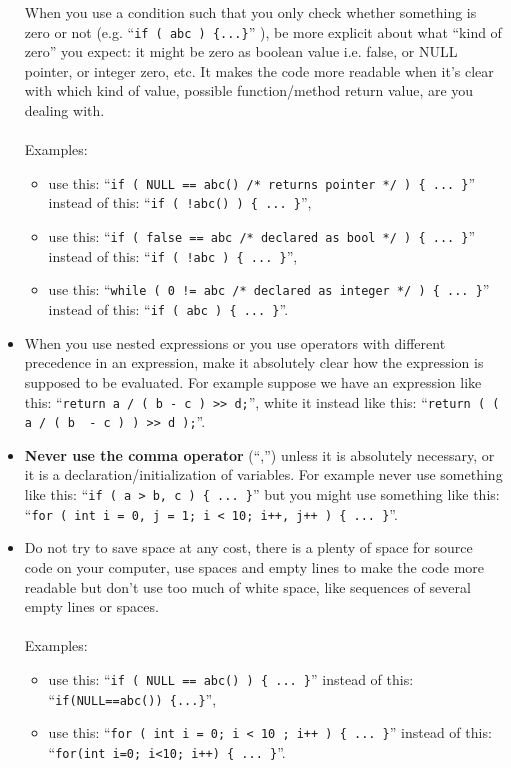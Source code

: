 \documentclass[a4paper,twoside,15pt]{book}
\begin{document}
\begin{itemize}
                When you use a condition such that you only check whether something is zero or not (e.g. ``\verb'if ( abc ) {...}''' ), be more explicit about what ``kind of zero'' you expect: it might be zero as boolean value i.e. false, or NULL pointer, or integer zero, etc. It makes the code more readable when it's clear with which kind of value, possible function/method return value, are you dealing with.\\\\
                Examples:
                \begin{itemize}
                    \item use this: ``\verb'if ( NULL == abc() /* returns pointer */ ) { ... }''' instead of this: ``\verb'if ( !abc() ) { ... }''',
                    \item use this: ``\verb'if ( false == abc /* declared as bool */ ) { ... }''' instead of this: ``\verb'if ( !abc ) { ... }''',
                    \item use this: ``\verb'while ( 0 != abc /* declared as integer */ ) { ... }''' instead of this: ``\verb'if ( abc ) { ... }'''.
                \end{itemize}
            \item
                When you use nested expressions or you use operators with different precedence in an expression, make it absolutely clear how the expression is supposed to be evaluated. For example suppose we have an expression like this: ``\verb'return a / ( b - c ) >> d;''', white it instead like this: ``\verb'return ( ( a / ( b  - c ) ) >> d );'''.
            \item
                \textbf{Never use the comma operator} (``,'') unless it is absolutely necessary, or it is a declaration/initialization of variables. For example never use something like this: ``\verb'if ( a > b, c ) { ... }''' but you might use something like this: ``\verb'for ( int i = 0, j = 1; i < 10; i++, j++ ) { ... }'''.
            \item
                Do not try to save space at any cost, there is a plenty of space for source code on your computer, use spaces and empty lines to make the code more readable but don't use too much of white space, like sequences of several empty lines or spaces.\\\\
                Examples:
                \begin{itemize}
                    \item use this: ``\verb'if ( NULL == abc() ) { ... }''' instead of this: ``\verb'if(NULL==abc()) {...}''',
                    \item use this: ``\verb'for ( int i = 0; i < 10 ; i++ ) { ... }''' instead of this:\\``\verb'for(int i=0; i<10; i++) { ... }'''.
                \end{itemize}
        \end{itemize}
\end{document}
